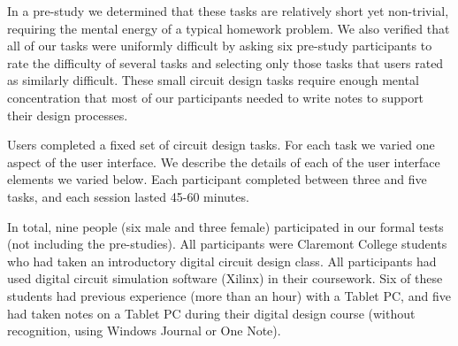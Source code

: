 \documentclass{egpubl}
\begin{document}


In a pre-study we determined that these tasks are relatively short yet
non-trivial, requiring the mental energy of a typical homework
problem.  We also verified that all of our tasks were uniformly
difficult by asking six pre-study participants to rate the difficulty
of several tasks and selecting only those tasks that users rated as
similarly difficult.  These small circuit design tasks require enough
mental concentration that most of our participants needed to write
notes to support their design processes. 

Users completed a fixed set of circuit design tasks.  For each task we
varied one aspect of the user interface.  We describe the details of
each of the user interface elements we varied below.  Each participant
completed between three and five tasks, and each session lasted 45-60
minutes.

In total, nine people (six male and three female) participated in our
formal tests (not including the pre-studies). All participants were
Claremont College students who had taken an introductory digital
circuit design class.  All participants had used digital circuit
simulation software (Xilinx) in their coursework.  Six of these
students had previous experience (more than an hour) with a Tablet PC,
and five had taken notes on a Tablet PC during their digital design
course (without recognition, using Windows Journal or One Note).
\end{document}
